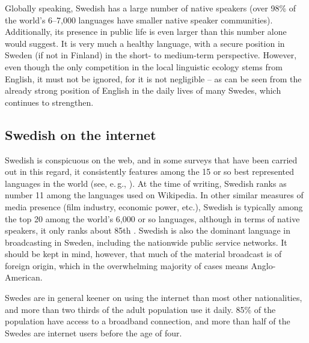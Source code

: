 \begin{multicols}{2}
Globally speaking, Swedish has a large number of native speakers (over
98\% of the world’s 6--7,000 languages have smaller native speaker
communities). Additionally, its presence in public life is even larger
than this number alone would suggest. It is very much a healthy
language, with a secure position in Sweden (if not in Finland) in the
short- to medium-term perspective. However, even though the only
competition in the local linguistic ecology stems from English, it
must not be ignored, for it is not negligible -- as can be seen from
the already strong position of English in the daily lives of many
Swedes, which continues to strengthen.

\subsection{Swedish on the internet}

Swedish is conspicuous on the web, and in some surveys that have been
carried out in this regard, it consistently features among the 15
or so best represented languages in the world (see, e.\,g.,
\cite[63]{parkvall2006}). At the time of writing, Swedish ranks as
number 11 among the languages used on Wikipedia. In other similar
measures of media presence (film industry, economic power, etc.),
Swedish is typically among the top 20 among the world’s 6,000 or so
languages, although in terms of native speakers, it only ranks about
85th \cite[55--64]{parkvall2006}. Swedish is also the dominant
language in broadcasting in Sweden, including the nationwide public
service networks. It should be kept in mind, however, that much of the
material broadcast is of foreign origin, which in the overwhelming
majority of cases means Anglo-American.


Swedes are in general keener on using the internet than most other
nationalities, and more than two thirds of the adult population use it
daily.\cite{findahl1} 85\% of
the population have access to a broadband connection, and more than
half of the Swedes are internet users before the age of four.
\end{multicols}

\clearpage


